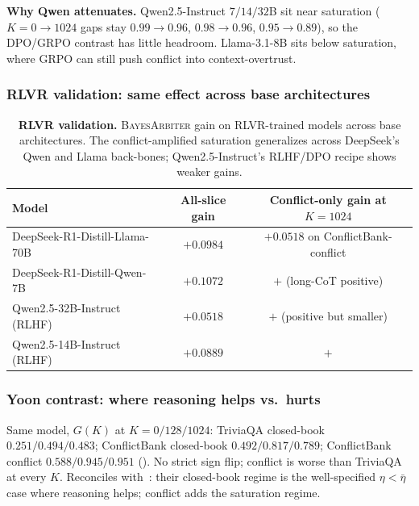 \textbf{Why Qwen attenuates.}  Qwen2.5-Instruct $7/14/32$B sit near
saturation ($K\!=\!0\!\to\!1024$ gaps stay $0.99\!\to\!0.96$,
$0.98\!\to\!0.96$, $0.95\!\to\!0.89$), so the DPO/GRPO contrast
has little headroom. Llama-3.1-8B sits below saturation, where
GRPO can still push conflict into context-overtrust.

\subsubsection{RLVR validation: same effect across base architectures}

\begin{table}[H]
\centering
\small
\caption{\textbf{RLVR validation.}  \textsc{BayesArbiter} gain on RLVR-trained models
across base architectures.  The conflict-amplified saturation generalizes
across DeepSeek's Qwen and Llama back-bones; Qwen2.5-Instruct's RLHF/DPO
recipe shows weaker gains.}
\label{tab:rlvr-validation}
\setlength{\tabcolsep}{4pt}
\begin{tabular}{lcc}
\toprule
\textbf{Model} & \textbf{All-slice gain} & \textbf{Conflict-only gain at $K{=}1024$}\\
\midrule
DeepSeek-R1-Distill-Llama-70B  & $+0.0984$ & $+0.0518$ on ConflictBank-conflict\\
DeepSeek-R1-Distill-Qwen-7B    & $+0.1072$ & $+$ (long-CoT positive)\\
Qwen2.5-32B-Instruct (RLHF)    & $+0.0518$ & $+$ (positive but smaller)\\
Qwen2.5-14B-Instruct (RLHF)    & $+0.0889$ & $+$\\
\bottomrule
\end{tabular}
\end{table}

\subsubsection{Yoon contrast: where reasoning helps vs.\ hurts}

Same model, $G(K)$ at $K\!=\!0/128/1024$:
TriviaQA closed-book $0.251 / 0.494 / 0.483$;
ConflictBank closed-book $0.492 / 0.817 / 0.789$;
ConflictBank conflict $0.588 / 0.945 / 0.951$
().  No strict sign flip; conflict is worse
than TriviaQA at every $K$.  Reconciles with~\citet{yoon2025confidence}:
their closed-book regime is the well-specified $\eta\!<\!\bar\eta$
case where reasoning helps; conflict adds the saturation regime.

